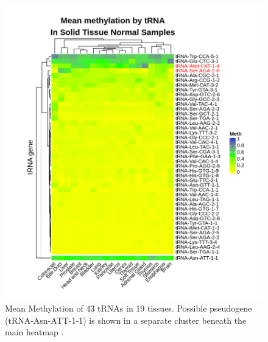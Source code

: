 \documentclass[
]{book}
\begin{document}
\begin{figure}

{\centering \includegraphics[width=0.9\linewidth]{./figs/meanBetasByTissueTNMpseudoSplitHeatmap} 

}

\caption{Mean Methylation of 43 tRNAs in 19 tissues. Possible pseudogene (tRNA-Asn-ATT-1-1) is shown in a separate cluster beneath the main heatmap \citep{Gu2016}.}\label{fig:meanBetasByTissueTNMHeatmap}
\end{figure}
\end{document}
